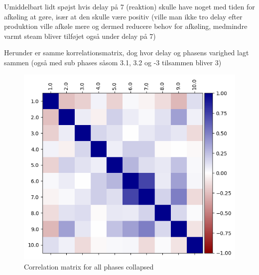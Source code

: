 \documentclass[../Thesis.tex]{subfiles}
\begin{document}
Umiddelbart lidt spøjst hvis delay på 7 (reaktion) skulle have noget med tiden for afkøling at gøre, især at den skulle være positiv (ville man ikke tro delay efter produktion ville afkøle mere og dermed reducere behov for afkøling, medmindre varmt steam bliver tilføjet også under delay på 7)




Herunder er samme korrelationsmatrix, dog hvor delay og phasens varighed lagt sammen (også med sub phases såsom 3.1, 3.2 og -3 tilsammen bliver 3)

\begin{figure}[H]
    \centering
    \includegraphics[width=.7\linewidth]{figures/Multiple cycles data/Correlation matrix collapsed phases.png}
    \caption{Correlation matrix for all phases collapsed}
\end{figure}
\end{document}
